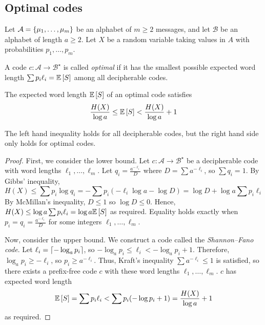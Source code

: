 \subsection{Optimal codes}
Let \( \mathcal A = \qty{\mu_1, \dots, \mu_m} \) be an alphabet of \( m \geq 2 \) messages, and let \( \mathcal B \) be an alphabet of length \( a \geq 2 \).
Let \( X \) be a random variable taking values in \( A \) with probabilities \( p_1, \dots, p_m \).
\begin{definition}
    A code \( c \colon \mathcal A \to \mathcal B^\star \) is called \emph{optimal} if it has the smallest possible expected word length \( \sum p_i \ell_i = \mathbb{E}\left[{S}\right] \) among all decipherable codes.
\end{definition}
\begin{theorem}
    The expected word length \( \mathbb{E}\left[{S}\right] \) of an optimal code satisfies
    \[ \frac{H(X)}{\log a} \leq \mathbb{E}\left[{S}\right] < \frac{H(X)}{\log a} + 1 \]
\end{theorem}
The left hand inequality holds for all decipherable codes, but the right hand side only holds for optimal codes.
\begin{proof}
    First, we consider the lower bound.
    Let \( c \colon \mathcal A \to \mathcal B^\star \) be a decipherable code with word lengths \( \ell_1, \dots, \ell_m \).
    Let \( q_i = \frac{a^{-\ell_i}}{D} \) where \( D = \sum a^{-\ell_i} \), so \( \sum q_i = 1 \).
    By Gibbs' inequality,
    \[ H(X) \leq \sum p_i \log q_i = -\sum p_i(-\ell_i \log a - \log D) = \log D + \log a \sum p_i \ell_i \]
    By McMillan's inequality, \( D \leq 1 \) so \( \log D \leq 0 \).
    Hence, \( H(X) \leq \log a \sum p_i \ell_i = \log a \mathbb{E}\left[{S}\right] \) as required.
    Equality holds exactly when \( p_i = q_i = \frac{a^{-\ell_i}}{D} \) for some integers \( \ell_1, \dots, \ell_m \).

    Now, consider the upper bound.
    We construct a code called the \emph{Shannon--Fano code}.
    Let \( \ell_i = \lceil-\log_a p_i\rceil \), so \( -\log_a p_i \leq \ell_i < -\log_a p_i + 1 \).
    Therefore, \( \log_a p_i \geq -\ell_i \), so \( p_i \geq a^{-\ell_i} \).
    Thus, Kraft's inequality \( \sum a^{-\ell_i} \leq 1 \) is satisfied, so there exists a prefix-free code \( c \) with these word lengths \( \ell_1, \dots, \ell_m \).
    \( c \) has expected word length
    \[ \mathbb{E}\left[{S}\right] = \sum p_i \ell_i < \sum p_i (-\log p_i + 1) = \frac{H(X)}{\log a} + 1 \]
    as required.
\end{proof}
